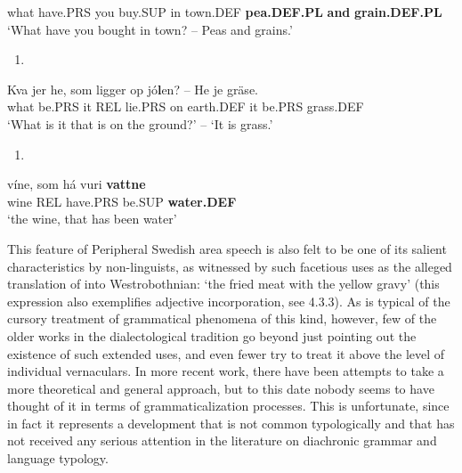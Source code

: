 what  have.PRS  you  buy.SUP  in  town.DEF    \textbf{pea.DEF.PL} \textbf{and} \textbf{grain.DEF.PL}\\ %


‘What have you bought in town? – Peas and grains.’
\z


\begin{enumerate} %
\item 
\end{enumerate} %
\ea\label{}
\gll Kva  jer  he,  som  ligger  op  jó\textbf{l}en?  –  He  je  gräse.\\


what  be.PRS  it  REL  lie.PRS  on  earth.DEF    it  be.PRS  grass.DEF\\ %


‘What is it that is on the ground?’ – ‘It is grass.’
\z


\begin{enumerate} %
\item 
\end{enumerate} %
\ea\label{}
\gll víne,  som  há  vuri  \textbf{vattne}\\


wine  REL  have.PRS  be.SUP  \textbf{water.DEF}\\ %


‘the wine, that has been water’
\z


This feature of Peripheral Swedish area speech is also felt to be one of its salient characteristics by non-linguists, as witnessed by such facetious uses as the alleged translation of into Westrobothnian:  ‘the fried meat with the yellow gravy’ (this expression also exemplifies adjective incorporation, see 4.3.3). As is typical of the cursory treatment of grammatical phenomena of this kind, however, few of the older works in the dialectological tradition go beyond just pointing out the existence of such extended uses, and even fewer try to treat it above the level of individual vernaculars. In more recent work, there have been attempts to take a more theoretical and general approach, but to this date nobody seems to have thought of it in terms of grammaticalization processes. This is unfortunate, since in fact it represents a development that is not common typologically and that has not received any serious attention in the literature on diachronic grammar and language typology.

